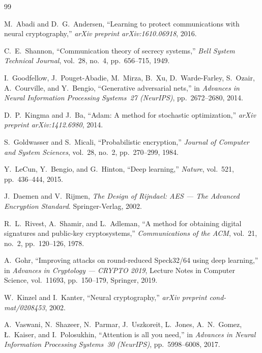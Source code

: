 \documentclass[12pt, a4paper]{article}
\begin{document}
\begin{thebibliography}{99}

M.~Abadi and D.~G.~Andersen,
\newblock ``Learning to protect communications with neural cryptography,''
\newblock \textit{arXiv preprint arXiv:1610.06918}, 2016.

C.~E.~Shannon,
\newblock ``Communication theory of secrecy systems,''
\newblock \textit{Bell System Technical Journal},
  vol.~28, no.~4, pp.~656--715, 1949.

I.~Goodfellow, J.~Pouget-Abadie, M.~Mirza, B.~Xu, D.~Warde-Farley,
  S.~Ozair, A.~Courville, and Y.~Bengio,
\newblock ``Generative adversarial nets,''
\newblock in \textit{Advances in Neural Information Processing Systems~27
  (NeurIPS)}, pp.~2672--2680, 2014.

D.~P.~Kingma and J.~Ba,
\newblock ``Adam: A method for stochastic optimization,''
\newblock \textit{arXiv preprint arXiv:1412.6980}, 2014.

S.~Goldwasser and S.~Micali,
\newblock ``Probabilistic encryption,''
\newblock \textit{Journal of Computer and System Sciences},
  vol.~28, no.~2, pp.~270--299, 1984.

Y.~LeCun, Y.~Bengio, and G.~Hinton,
\newblock ``Deep learning,''
\newblock \textit{Nature}, vol.~521, pp.~436--444, 2015.

J.~Daemen and V.~Rijmen,
\newblock \textit{The Design of Rijndael: AES — The Advanced Encryption
  Standard}.
\newblock Springer-Verlag, 2002.

R.~L.~Rivest, A.~Shamir, and L.~Adleman,
\newblock ``A method for obtaining digital signatures and public-key
  cryptosystems,''
\newblock \textit{Communications of the ACM},
  vol.~21, no.~2, pp.~120--126, 1978.

A.~Gohr,
\newblock ``Improving attacks on round-reduced Speck32/64 using deep learning,''
\newblock in \textit{Advances in Cryptology --- CRYPTO 2019},
  Lecture Notes in Computer Science, vol.~11693, pp.~150--179, Springer, 2019.

W.~Kinzel and I.~Kanter,
\newblock ``Neural cryptography,''
\newblock \textit{arXiv preprint cond-mat/0208453}, 2002.

A.~Vaswani, N.~Shazeer, N.~Parmar, J.~Uszkoreit, L.~Jones, A.~N.~Gomez,
  \L.~Kaiser, and I.~Polosukhin,
\newblock ``Attention is all you need,''
\newblock in \textit{Advances in Neural Information Processing Systems~30
  (NeurIPS)}, pp.~5998--6008, 2017.

\end{thebibliography}

\end{document}
